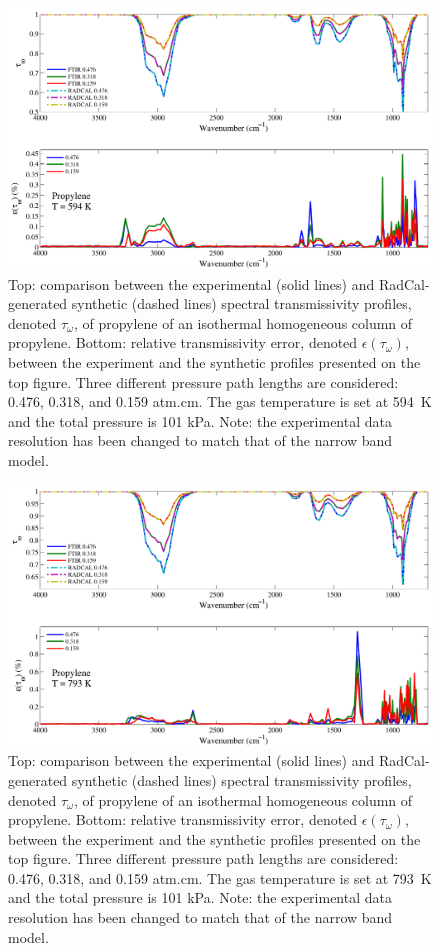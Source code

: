 \begin{figure}[p]
\includegraphics[width=\textwidth]{../Verification/Results_Test2/Propylene_594.pdf}
\caption{Top: comparison between the experimental (solid lines) and RadCal-generated synthetic (dashed lines) spectral transmissivity profiles, denoted $\tau_{\omega}$, of propylene of an isothermal homogeneous column of propylene. Bottom: relative transmissivity error, denoted $\epsilon{(\tau_{\omega})}$, between the experiment and the synthetic profiles presented on the top figure. Three different pressure path lengths are considered: 0.476, 0.318, and 0.159 atm.cm. The gas temperature is set at 594~K and the total pressure is 101 kPa. Note: the experimental data resolution has been changed to match that of the narrow band model. \label{fig:propylene_Verify_594K}}
\end{figure}

\begin{figure}[p]
\includegraphics[width=\textwidth]{../Verification/Results_Test2/Propylene_793.pdf}
\caption{Top: comparison between the experimental (solid lines) and RadCal-generated synthetic (dashed lines) spectral transmissivity profiles, denoted $\tau_{\omega}$, of propylene of an isothermal homogeneous column of propylene. Bottom: relative transmissivity error, denoted $\epsilon{(\tau_{\omega})}$, between the experiment and the synthetic profiles presented on the top figure. Three different pressure path lengths are considered: 0.476, 0.318, and 0.159 atm.cm. The gas temperature is set at 793~K and the total pressure is 101 kPa. Note: the experimental data resolution has been changed to match that of the narrow band model. \label{fig:propylene_Verify_793K}}
\end{figure}
\newpage

